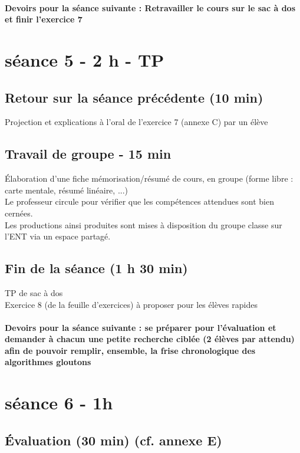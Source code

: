 \documentclass[12pt,french]{report}
\begin{document}
\paragraph{Devoirs pour la séance suivante :
	Retravailler le cours sur le sac à dos et finir l'exercice 7}

\section{séance 5 - 2 h - TP }
\subsection{Retour sur la séance précédente (10 min)}
Projection et explications à l’oral de l'exercice 7 (annexe C) par un élève
\subsection{Travail de groupe - 15 min }
Élaboration d'une fiche mémorisation/résumé de cours, en groupe (forme libre : carte mentale, résumé linéaire, ...)\\
Le professeur circule pour vérifier que les compétences attendues sont bien cernées.\\
Les productions ainsi produites sont mises à disposition du groupe classe sur l'ENT via un espace partagé.\\

\subsection{Fin de la séance (1 h 30 min)}
TP de sac à dos\\
Exercice 8 (de la feuille d'exercices) à proposer pour les élèves rapides
\paragraph{Devoirs pour la séance suivante : 
	se préparer pour l'évaluation et demander à chacun une petite recherche ciblée (2 élèves par attendu) afin de pouvoir remplir, ensemble, la frise chronologique des algorithmes gloutons\\
}
\section{séance 6 - 1h }
\subsection{Évaluation (30 min) (cf. annexe E)}
\end{document}
